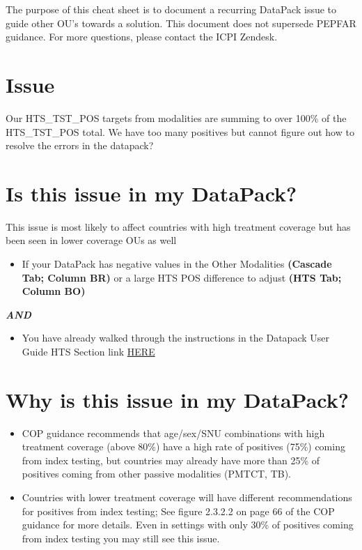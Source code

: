 \documentclass[
  openany]{book}
\providecommand{\tightlist}{%
  \setlength{\itemsep}{0pt}\setlength{\parskip}{0pt}}
\begin{document}
The purpose of this cheat sheet is to document a recurring DataPack issue to guide other OU's towards a solution. This document does not supersede PEPFAR guidance. For more questions, please contact the ICPI Zendesk.

\hypertarget{issue}{%
\section{Issue}\label{issue}}

Our HTS\_TST\_POS targets from modalities are summing to over 100\% of the HTS\_TST\_POS total. We have too many positives but cannot figure out how to resolve the errors in the datapack?

\hypertarget{is-this-issue-in-my-datapack}{%
\section{Is this issue in my DataPack?}\label{is-this-issue-in-my-datapack}}

This issue is most likely to affect countries with high treatment coverage but has been seen in lower coverage OUs as well

\begin{itemize}
\tightlist
\item
  If your DataPack has negative values in the Other Modalities \textbf{(Cascade Tab; Column BR)} or a large HTS POS difference to adjust \textbf{(HTS Tab; Column BO)}
\end{itemize}

\textbf{\emph{AND}}

\begin{itemize}
\tightlist
\item
  You have already walked through the instructions in the Datapack User Guide HTS Section link \href{https://apps.datim.org/datapack-userguide/15-HTS.html}{HERE}
\end{itemize}

\hypertarget{why-is-this-issue-in-my-datapack}{%
\section{Why is this issue in my DataPack?}\label{why-is-this-issue-in-my-datapack}}

\begin{itemize}
\tightlist
\item
  COP guidance recommends that age/sex/SNU combinations with high treatment coverage (above 80\%) have a high rate of positives (75\%) coming from index testing, but countries may already have more than 25\% of positives coming from other passive modalities (PMTCT, TB).
\item
  Countries with lower treatment coverage will have different recommendations for positives from index testing; See figure 2.3.2.2 on page 66 of the COP guidance for more details. Even in settings with only 30\% of positives coming from index testing you may still see this issue.
\end{itemize}
\end{document}
